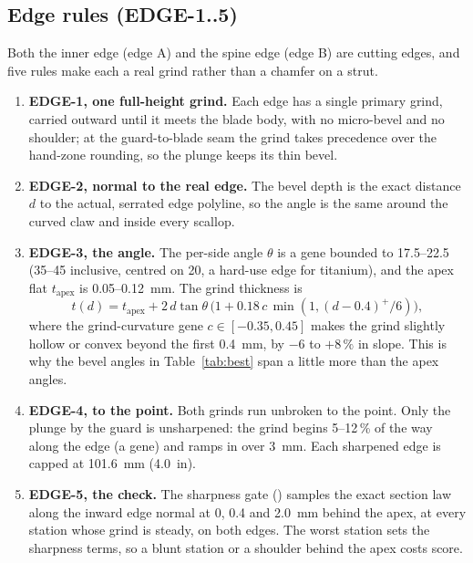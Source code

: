 \subsection{Edge rules (EDGE-1..5)}
Both the inner edge (edge A) and the spine edge (edge B) are cutting edges, and five rules make each a real grind rather
than a chamfer on a strut.
\begin{enumerate}
\item \textbf{EDGE-1, one full-height grind.} Each edge has a single primary grind, carried outward until it meets the
blade body, with no micro-bevel and no shoulder; at the guard-to-blade seam the grind takes precedence over the
hand-zone rounding, so the plunge keeps its thin bevel.
\item \textbf{EDGE-2, normal to the real edge.} The bevel depth is the exact distance $d$ to the actual, serrated edge
polyline, so the angle is the same around the curved claw and inside every scallop.
\item \textbf{EDGE-3, the angle.} The per-side angle $\theta$ is a gene bounded to 17.5--22.5\textdegree{}
(35--45\textdegree{} inclusive, centred on 20\textdegree, a hard-use edge for titanium), and the apex flat
$t_\mathrm{apex}$ is 0.05--0.12~mm. The grind thickness is
\begin{equation}
t(d) = t_\mathrm{apex} + 2\,d \tan\theta\,\bigl(1 + 0.18\,c\,\min(1, (d - 0.4)^+/6)\bigr),
\end{equation}
where the grind-curvature gene $c \in [-0.35, 0.45]$ makes the grind slightly hollow or convex beyond the first
0.4~mm, by $-6$ to $+8\,\%$ in slope. This is why the bevel angles in Table~\ref{tab:best} span a little more than the
apex angles.
\item \textbf{EDGE-4, to the point.} Both grinds run unbroken to the point. Only the plunge by the guard is
unsharpened: the grind begins 5--12\,\% of the way along the edge (a gene) and ramps in over 3~mm. Each sharpened edge
is capped at 101.6~mm (4.0~in).
\item \textbf{EDGE-5, the check.} The sharpness gate () samples the exact
section law along the inward edge normal at 0, 0.4 and 2.0~mm behind the apex, at every station whose grind is steady,
on both edges. The worst station sets the sharpness terms, so a blunt station or a shoulder behind the apex costs score.
\end{enumerate}

